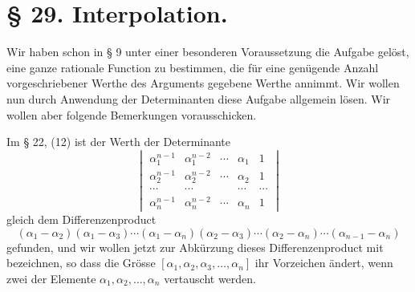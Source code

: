 \documentclass[11pt]{article}
\begin{document}
\section*{§ 29. Interpolation.}

Wir haben schon in § 9 unter einer besonderen Voraussetzung die Aufgabe gelöst, eine ganze rationale Function zu bestimmen, die für eine genügende Anzahl vorgeschriebener Werthe des Arguments gegebene Werthe annimmt. Wir wollen nun durch Anwendung der Determinanten diese Aufgabe allgemein lösen. Wir wollen aber folgende Bemerkungen vorausschicken.

Im § 22, (12) ist der Werth der Determinante
\[
\begin{vmatrix}
 \alpha_1^{n-1}&\alpha_1^{n-2}&\cdots&\alpha_1&1\\
 \alpha_2^{n-1}&\alpha_2^{n-2}&\cdots&\alpha_2&1\\
 \cdots&\cdots&&\cdots&\cdots\\
 \alpha_n^{n-1}&\alpha_n^{n-2}&\cdots&\alpha_n&1
\end{vmatrix}
\]
gleich dem Differenzenproduct
\begin{equation}
(\alpha_1-\alpha_2)(\alpha_1-\alpha_3)\cdots(\alpha_1-\alpha_n)
(\alpha_2-\alpha_3)\cdots(\alpha_2-\alpha_n)\cdots(\alpha_{n-1}-\alpha_n)\tag{1}
\end{equation}
gefunden, und wir wollen jetzt zur Abkürzung dieses Differenzenproduct mit
\begin{equation}
 [\alpha_1,\alpha_2,\alpha_3,\ldots,\alpha_n]\tag{2}
\end{equation}
bezeichnen, so dass die Grösse $[\alpha_1,\alpha_2,\alpha_3,\ldots,\alpha_n]$ ihr Vorzeichen ändert, wenn zwei der Elemente $\alpha_1,\alpha_2,\ldots,\alpha_n$ vertauscht werden.
\end{document}
